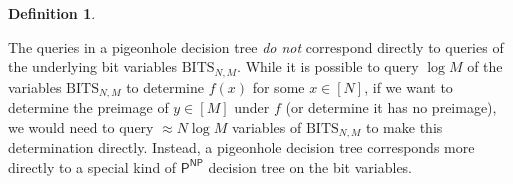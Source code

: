 \documentclass[11pt]{article}
\newtheorem{definition}{Definition}
\newcommand{\todo}[1]{\textcolor{red}{TODO: #1}}
\newcommand{\rng}{\mathrm{range}}
\newcommand{\nodes}{\mathrm{nodes}}
\begin{document}
\begin{definition}
\end{definition}

 The queries in a pigeonhole decision tree \emph{do not} correspond directly to queries of the underlying bit variables $\mathrm{BITS}_{N,M}$. While it is possible to query $\log M$ of the variables $\mathrm{BITS}_{N,M}$ to determine $f(x)$ for some $x \in [N]$, if we want to determine the preimage of $y \in [M]$ under $f$ (or determine it has no preimage), we would need to query $\approx N \log M$ variables of $\mathrm{BITS}_{N,M}$ to make this determination directly. Instead, a pigeonhole decision tree corresponds more directly to a special kind of $\mathsf{P^{NP}}$ decision tree on the bit variables.




\end{document}
